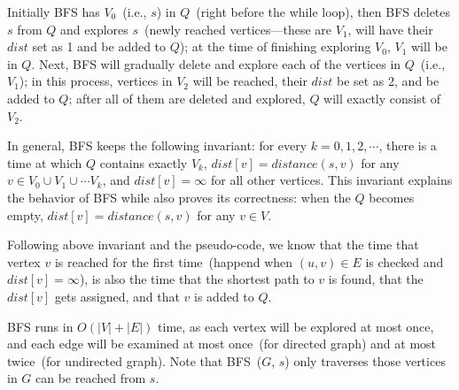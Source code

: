 
\begin{minipage}{0.8\textwidth}
	\xxx
	\xxx
	\xxx
	\xxx
	\xxx
	\xxx
	\xxx
	\xxx
	\xxx
	\xxx
	\xxx
	\xxx
	\xxx
	\xxx
	\xxx
	\xxx
\end{minipage}




Initially BFS has $V_0$~(i.e., $s$) in $Q$~(right before the while loop), 
then BFS deletes $s$ from $Q$ and explores $s$~(newly reached vertices---these are $V_1$, will have their $dist$ set as 1 and be added to $Q$);
at the time of finishing exploring $V_0$, $V_1$ will be in $Q$. 
Next, BFS will gradually delete and explore each of the vertices in $Q$~(i.e., $V_1$);
in this process, vertices in $V_2$ will be reached, their $dist$ be set as 2, and be added to $Q$;
after all of them are deleted and explored, $Q$ will exactly consist of $V_2$.

In general, BFS keeps the following invariant: for every $k = 0, 1, 2, \cdots$, 
there is a time at which $Q$ contains exactly $V_k$, $dist[v] = distance(s, v)$ for any $v\in V_0\cup V_1\cup \cdots V_k$,
and $dist[v] = \infty$ for all other vertices.
This invariant explains the behavior of BFS while also proves its correctness:
when the $Q$ becomes empty, $dist[v] = distance(s, v)$ for any $v\in V$.

Following above invariant and the pseudo-code, we know that the time that vertex $v$ is reached for the first time~(happend when $(u,v)\in E$ is checked and $dist[v] = \infty$),
is also the time that the shortest path to $v$ is found, that the $dist[v]$ gets assigned, and that $v$ is added to $Q$.


BFS runs in $O(|V| + |E|)$ time, as each vertex will be explored at most once, and each 
edge will be examined at most once~(for directed graph) and at most twice~(for undirected graph).
Note that BFS~($G$, $s$) only traverses those vertices in $G$ can be reached from $s$.


